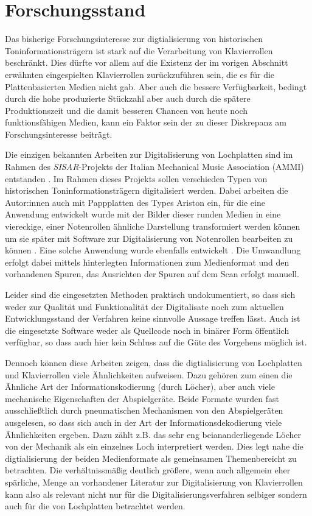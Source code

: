 \section{Forschungsstand} \label{Forschungsstand}

Das bisherige Forschungsinteresse zur digtialisierung von historischen Toninformationsträgern ist stark auf die Verarbeitung von Klavierrollen beschränkt.
Dies dürfte vor allem auf die Existenz der im vorigen Abschnitt erwähnten eingespielten Klavierrollen zurückzuführen sein, die es für die Plattenbasierten Medien nicht gab.
Aber auch die bessere Verfügbarkeit, bedingt durch die hohe produzierte Stückzahl aber auch durch die spätere Produktionszeit und die damit besseren Chancen von heute noch funktionsfähigen Medien, kann ein Faktor sein der zu dieser Diskrepanz am Forschungsinteresse beiträgt.

Die einzigen bekannten Arbeiten zur Digitalisierung von Lochplatten sind im Rahmen des \textit{SISAR}-Projekts der Italian Mechanical Music Association (AMMI) entstanden \parencite[]{pedrazzini_2013,perretti_2014}.
Im Rahmen dieses Projekts sollen verschieden Typen von historischen Toninformationsträgern digitalisiert werden.
Dabei arbeiten die Autor:innen auch mit Pappplatten des Types Ariston ein, für die eine Anwendung entwickelt wurde mit der Bilder dieser runden Medien in eine viereckige, einer Notenrollen ähnliche Darstellung transformiert werden können um sie später mit Software zur Digitalisierung von Notenrollen bearbeiten zu können \parencite[]{perretti_2014}.
Eine solche Anwendung wurde ebenfalls entwickelt \parencite[]{conversion}.
Die Umwandlung erfolgt dabei mittels hinterlegten Informationen zum Medienformat und den vorhandenen Spuren, das Ausrichten der Spuren auf dem Scan erfolgt manuell.

Leider sind die eingesetzten Methoden praktisch undokumentiert, so dass sich weder zur Qualität und Funktionalität der Digitalisate noch zum aktuellen Entwicklungsstand der Verfahren keine sinnvolle Aussage treffen lässt.
Auch ist die eingesetzte Software weder als Quellcode noch in binärer Form öffentlich verfügbar, so dass auch hier kein Schluss auf die Güte des Vorgehens möglich ist.

Dennoch können diese Arbeiten zeigen, dass die digtialisierung von Lochplatten und Klavierrollen viele Ähnlichkeiten aufweisen.
Dazu gehören zum einen die Ähnliche Art der Informationskodierung (durch Löcher), aber auch viele mechanische Eigenschaften der Abspielgeräte.
Beide Formate wurden fast ausschließtlich durch pneumatischen Mechanismen von den Abspielgeräten ausgelesen, so dass sich auch in der Art der Informationsdekodierung viele Ähnlichkeiten ergeben.
Dazu zählt z.B. das sehr eng beiananderliegende Löcher von der Mechanik als ein einzelnes Loch interpretiert werden.
Dies legt nahe die digtialisierung der beiden Medienformate als gemeinsamen Themenbereicht zu betrachten.
Die verhältnissmäßig deutlich größere, wenn auch allgemein eher spärliche, Menge an vorhandener Literatur zur Digitalisierung von Klavierrollen kann also als relevant nicht nur für die Digitalisierungsverfahren selbiger sondern auch für die von Lochplatten betrachtet werden.

